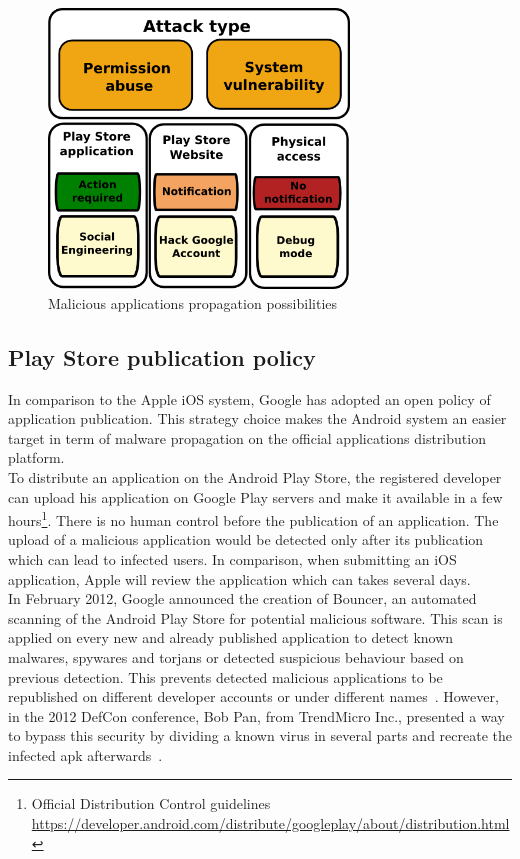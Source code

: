 \begin{figure}[h]
  \centering
  \includegraphics[width=8cm]{images/secu-graph.png}
  \caption{Malicious applications propagation possibilities}
  \label{fig:secu-graph}
\end{figure}

\subsection{Play Store publication policy}
\label{sec:playstore-publication-policy}

In comparison to the Apple iOS system, Google has adopted an open policy of application publication.
This strategy choice makes the Android system an easier target in term of malware propagation on the official applications distribution platform.\\

To distribute an application on the Android Play Store, the registered developer can upload his application on Google Play servers and make it available in a few hours\footnote{Official Distribution Control guidelines \url{https://developer.android.com/distribute/googleplay/about/distribution.html}}.
There is no human control before the publication of an application.
The upload of a malicious application would be detected only after its publication which can lead to infected users.
In comparison, when submitting an iOS application, Apple will review the application which can takes several days.\\

In February 2012, Google announced the creation of Bouncer, an automated scanning of the Android Play Store for potential malicious software.
This scan is applied on every new and already published application to detect known malwares, spywares and torjans or detected suspicious behaviour based on previous detection.
This prevents detected malicious applications to be republished on different developer accounts or under different names~\cite{secu-bouncer}.
However, in the 2012 DefCon conference, Bob Pan, from TrendMicro Inc., presented a way to bypass this security by dividing a known virus in several parts and recreate the infected apk afterwards~\cite{secu-defcon}.\\

